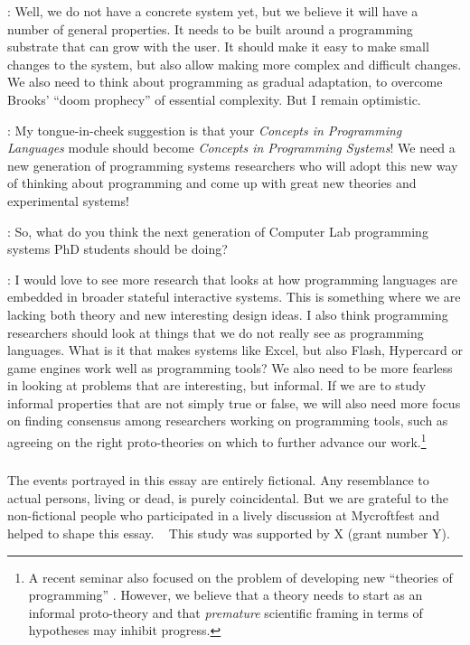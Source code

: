 \documentclass[runningheads]{llncs}
\newcommand{\T}{Tomas}
\newcommand{\J}{Joel}
\newcommand{\says}[2][gg]{\vspace{0.5em}\noindent\hangindent=0.5cm{\textsc{#1}}: #2}
\begin{document}
\says[\J]{Well, we do not have a concrete system yet, but we believe it will have a number of general properties. It needs to be built around a programming substrate that can grow with the user. It should make it easy to make small changes to the system, but also allow making more complex and difficult changes. We also need to think about programming as gradual adaptation, to overcome Brooks' ``doom prophecy'' of essential complexity. But I remain optimistic.}

\says[\T]{My tongue-in-cheek suggestion is that your
\emph{Concepts in Programming Languages} module should become
\emph{Concepts in Programming Systems}! We need a new generation of programming systems researchers who will adopt this new way of thinking about programming and come up with great new theories and experimental systems!}

\says[Alan]{So, what do you think the next generation of Computer Lab programming systems PhD students should be doing?}

\says[\J]{I would love to see more research that looks at how programming languages are embedded in broader stateful interactive systems. This is something where we are lacking both theory and new interesting design ideas. I also think programming researchers should look at things that we do not really see as programming languages. What is it that makes systems like Excel, but also Flash, Hypercard or game engines work well as programming tools? We also need to be more fearless in looking at problems that are interesting, but informal. If we are to study informal properties that are not simply true or false, we will also need more focus on finding consensus among researchers working on programming tools, such as agreeing on the right proto-theories on which to further advance our work.\footnote{A recent seminar also focused on the problem of developing new ``theories of programming'' \cite{latoza-2023-theories}. However, we believe that a theory needs to start as an informal proto-theory and that \emph{premature} scientific framing in terms of hypotheses may inhibit progress.}}

\begin{credits}
\subsubsection{\ackname}
The events portrayed in this essay are entirely fictional. Any resemblance to actual persons, living or dead, is purely coincidental. But we are grateful to the non-fictional people who participated in a lively discussion at Mycroftfest and helped to shape this essay.
~
This study was supported by X (grant number Y).
\end{credits}



\end{document}

